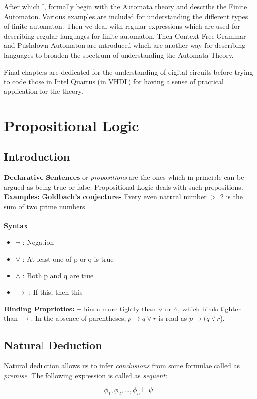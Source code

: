 \documentclass{report}
\begin{document}
After which I, formally begin with the Automata theory and describe the Finite Automaton. Various examples are included for understanding the different types of finite automaton. Then we deal with regular expressions which are used for describing regular languages for finite automaton. Then Context-Free Grammar and Pushdown Automaton are introduced which are another way for describing languages to broaden the spectrum of understanding the Automata Theory. 

Final chapters are dedicated for the understanding of digital circuits before trying to code those in Intel Quartus (in VHDL) for having a sense of practical application for the theory. 

\chapter{Propositional Logic}
\section{Introduction}
\textbf{Declarative Sentences} or \textit{propositions} are the ones which in principle can be argued as being true or false. Propositional Logic deals with such propositions. \textbf{Examples:} \textbf{Goldbach's conjecture- }Every even natural number $>$ 2 is the sum of two prime numbers. \\
\\
\textbf{\large{Syntax}}
\begin{itemize}
    \item $\neg$ : Negation
    \item $\vee$ : At least one of p or q is true
    \item $\wedge$ : Both p and q are true
    \item $\to$ : If this, then this
\end{itemize}

\textbf{Binding Proprieties:} $\neg$ binds more tightly than $\vee$ or $\wedge$, which binds tighter than $\to$. In the absence of parentheses, $p \to q \vee r$ is read as $p \to (q \vee r$).  


\section{Natural Deduction}
Natural deduction allows us to infer \textit{conclusions} from some formulae called as \textit{premise}. The following expression is called as \textit{sequent}:
\vspace{-1.5em}
\begin{center}
$$\phi_1, \phi_2,\ldots, \phi_n \vdash \psi$$
\end{center} 
\end{document}
